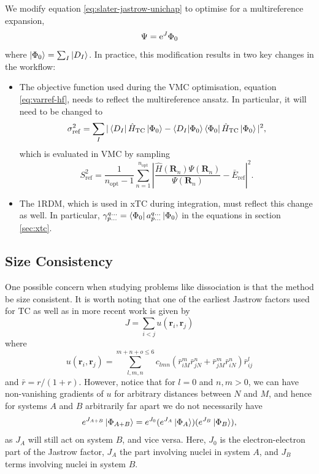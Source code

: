 We modify equation \ref{eq:slater-jastrow-unichap} to optimise for a multireference expansion,
\begin{equation}
    \label{eq:general-slater-jastrow}
    \Psi = \mathrm{e}^J\Phi_0
\end{equation}
where $\ket{\Phi_0}=\sum_I\ket{D_I}$. In practice, this modification results in two key changes in the workflow:
\begin{itemize}
    \item The objective function used during the VMC optimisation, equation \ref{eq:varref-hf}, needs to reflect the multireference ansatz. In particular, it will need to be changed to
    \begin{equation}
        \label{eq:varref-md}
        \sigma_\mathrm{ref}^2 = \sum_{I}|\bra{D_I}\hat H_\mathrm{TC}\ket{\Phi_0} - \braket{D_I}{\Phi_0}\bra{\Phi_0}\hat H_\mathrm{TC}\ket{\Phi_0}|^2,
    \end{equation}
    which is evaluated in VMC by sampling
    \begin{equation}
        S_\mathrm{ref}^2 =
          \frac 1 {n_\mathrm{opt}-1}
          \sum_{n=1}^{n_\mathrm{opt}}
            \left| \frac {\hat H({\bm R}_n) \Psi({\bm R}_n)}
                         {\Psi({\bm R}_n)} - {\bar E}_\mathrm{ref}
            \right|^2.
    \end{equation}
    \item The \gls{1RDM}, which is used in xTC during integration, must reflect this change as well. In particular, $\gamma_{p\dots}^{q\dots}=\bra{\Phi_0} a_{p\dots}^{q\dots}\ket{\Phi_0}$ in the equations in section \ref{sec:xtc}.
\end{itemize}

\subsection{Size Consistency}

One possible concern when studying problems like dissociation is that the method be size consistent. It is worth noting that one of the earliest Jastrow factors used for TC\supercite{boysCalculation1969} as well as in more recent work\supercite{cohenSimilarity2019} is given by
\begin{equation}
\label{eq:boyshandyjastrow}
J = \sum_{i<j} u(\bm r_i, \bm r_j)
\end{equation}
where
\begin{equation}
u(\bm r_i, \bm r_j) = \sum_{l,m,n}^{m+n+o\leq 6} c_{lmn}(\bar r_{iM}^m\bar r_{jN}^n+\bar r_{jM}^m\bar r_{iN}^n)\bar r_{ij}^l
\end{equation}
and $\bar r = r/(1+r)$.
However, notice that for $l=0$ and $n,m>0$, we can have non-vanishing gradients of $u$ for arbitrary distances between $N$ and $M$, and hence for systems $A$ and $B$ arbitrarily far apart we do not necessarily have
\begin{equation}
\label{eq:size-consistency}
e^{J_{A+B}}\ket{\Phi_{A+B}} = e^{J_0}(e^{J_{A}}\ket{\Phi_{A}})(e^{J_{B}}\ket{\Phi_{B}}),
\end{equation}
as $J_A$ will still act on system $B$, and vice versa. Here, $J_0$ is the electron-electron part of the Jastrow factor, $J_A$ the part involving nuclei in system $A$, and $J_B$ terms involving nuclei in system $B$.

